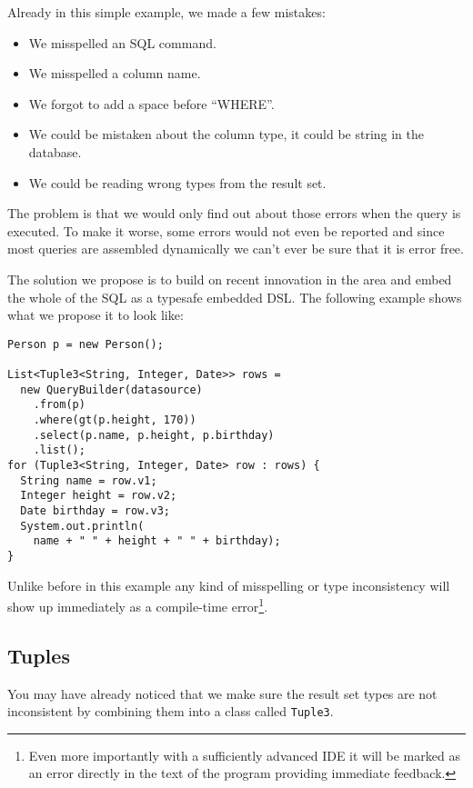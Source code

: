 \documentclass{sig-alternate}
\begin{document}
Already in this simple example, we made a few mistakes:
\begin{itemize}
\item We misspelled an SQL command.
\item We misspelled a column name.
\item We forgot to add a space before ``WHERE''.
\item We could be mistaken about the column type, it could be string in the database.
\item We could be reading wrong types from the result set.
\end{itemize}
The problem is that we would only find out about those errors when the query is executed. To make it worse, some errors would not even be reported and since most queries are assembled dynamically we can't ever be sure that it is error free.

The solution we propose is to build on recent innovation in the area and embed the whole of the SQL as a typesafe embedded DSL. The following example shows what we propose it to look like:

\begin{verbatim}
Person p = new Person(); 

List<Tuple3<String, Integer, Date>> rows =
  new QueryBuilder(datasource)
    .from(p)
    .where(gt(p.height, 170))
    .select(p.name, p.height, p.birthday)
    .list();
for (Tuple3<String, Integer, Date> row : rows) {
  String name = row.v1;
  Integer height = row.v2;
  Date birthday = row.v3;
  System.out.println(
    name + " " + height + " " + birthday);
}
\end{verbatim}

Unlike before in this example any kind of misspelling or type inconsistency will show up immediately as a compile-time error\footnote{Even more importantly with a sufficiently advanced IDE it will be marked as an error directly in the text of the program providing immediate feedback.}.

\subsection{Tuples}

You may have already noticed that we make sure the result set types are not inconsistent by combining them into a class called \verb!Tuple3!.
\end{document}
